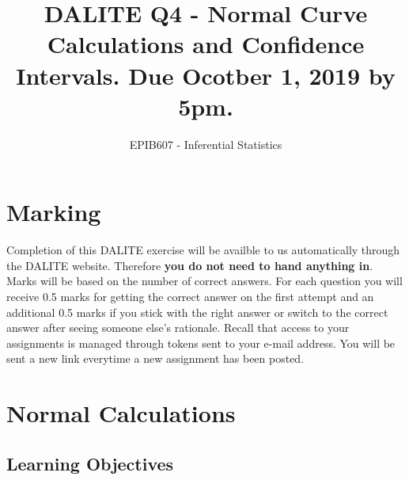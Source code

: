 \documentclass[letterpaper,9pt,twocolumn,twoside,printwatermark=false]{pinp}
\title{DALITE Q4 - Normal Curve Calculations and Confidence Intervals. Due
Ocotber 1, 2019 by 5pm.}
\author[a]{EPIB607 - Inferential Statistics}
\affil[a]{Fall 2019, McGill University}
\begin{document}
\verticaladjustment{-2pt}

\maketitle
\thispagestyle{firststyle}



\hypertarget{marking}{%
\section*{Marking}\label{marking}}

Completion of this DALITE exercise will be availble to us automatically
through the DALITE website. Therefore \textbf{you do not need to hand
anything in}. Marks will be based on the number of correct answers. For
each question you will receive 0.5 marks for getting the correct answer
on the first attempt and an additional 0.5 marks if you stick with the
right answer or switch to the correct answer after seeing someone else's
rationale. Recall that access to your assignments is managed through
tokens sent to your e-mail address. You will be sent a new link
everytime a new assignment has been posted.

\hypertarget{normal-calculations}{%
\section{Normal Calculations}\label{normal-calculations}}

\hypertarget{learning-objectives}{%
\subsection{Learning Objectives}\label{learning-objectives}}
\end{document}
